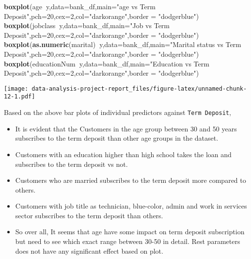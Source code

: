 \documentclass[
]{article}
\newenvironment{Shaded}{\begin{snugshade}}{\end{snugshade}}
\newcommand{\DataTypeTok}[1]{\textcolor[rgb]{0.13,0.29,0.53}{#1}}
\newcommand{\DecValTok}[1]{\textcolor[rgb]{0.00,0.00,0.81}{#1}}
\newcommand{\KeywordTok}[1]{\textcolor[rgb]{0.13,0.29,0.53}{\textbf{#1}}}
\newcommand{\NormalTok}[1]{#1}
\newcommand{\OperatorTok}[1]{\textcolor[rgb]{0.81,0.36,0.00}{\textbf{#1}}}
\newcommand{\StringTok}[1]{\textcolor[rgb]{0.31,0.60,0.02}{#1}}
\begin{document}
\begin{Shaded}
\begin{Highlighting}[]
\KeywordTok{boxplot}\NormalTok{(age}\OperatorTok{~}\NormalTok{y,}\DataTypeTok{data=}\NormalTok{bank_df,}\DataTypeTok{main=}\StringTok{"age vs Term Deposit"}\NormalTok{,}\DataTypeTok{pch=}\DecValTok{20}\NormalTok{,}\DataTypeTok{cex=}\DecValTok{2}\NormalTok{,}\DataTypeTok{col=}\StringTok{"darkorange"}\NormalTok{,}\DataTypeTok{border =} \StringTok{"dodgerblue"}\NormalTok{)}
\KeywordTok{boxplot}\NormalTok{(jobclass}\OperatorTok{~}\NormalTok{y,}\DataTypeTok{data=}\NormalTok{bank_df,}\DataTypeTok{main=}\StringTok{"Job vs Term Deposit"}\NormalTok{,}\DataTypeTok{pch=}\DecValTok{20}\NormalTok{,}\DataTypeTok{cex=}\DecValTok{2}\NormalTok{,}\DataTypeTok{col=}\StringTok{"darkorange"}\NormalTok{,}\DataTypeTok{border =} \StringTok{"dodgerblue"}\NormalTok{)}
\KeywordTok{boxplot}\NormalTok{(}\KeywordTok{as.numeric}\NormalTok{(marital)}\OperatorTok{~}\NormalTok{y,}\DataTypeTok{data=}\NormalTok{bank_df,}\DataTypeTok{main=}\StringTok{"Marital status vs Term Deposit"}\NormalTok{,}\DataTypeTok{pch=}\DecValTok{20}\NormalTok{,}\DataTypeTok{cex=}\DecValTok{2}\NormalTok{,}\DataTypeTok{col=}\StringTok{"darkorange"}\NormalTok{,}\DataTypeTok{border =} \StringTok{"dodgerblue"}\NormalTok{)}
\KeywordTok{boxplot}\NormalTok{(educationNum}\OperatorTok{~}\NormalTok{y,}\DataTypeTok{data=}\NormalTok{bank_df,}\DataTypeTok{main=}\StringTok{"Education vs Term Deposit"}\NormalTok{,}\DataTypeTok{pch=}\DecValTok{20}\NormalTok{,}\DataTypeTok{cex=}\DecValTok{2}\NormalTok{,}\DataTypeTok{col=}\StringTok{"darkorange"}\NormalTok{,}\DataTypeTok{border =} \StringTok{"dodgerblue"}\NormalTok{)}
\end{Highlighting}
\end{Shaded}

\texttt{[image: data-analysis-project-report\_files/figure-latex/unnamed-chunk-12-1.pdf]}

Based on the above bar plots of individual predictors against
\texttt{Term\ Deposit},

\begin{itemize}
\item
  It is evident that the Customers in the age group between 30 and 50
  years subscribes to the term deposit than other age groups in the
  dataset.
\item
  Customers with an education higher than high school takes the loan and
  subscribes to the term deposit vs not.
\item
  Customers who are married subscribes to the term deposit more compared
  to others.
\item
  Customers with job title as technician, blue-color, admin and work in
  services sector subscribes to the term deposit than others.
\item
  So over all, It seems that age have some impact on term deposit
  subscription but need to see which exact range between 30-50 in
  detail. Rest parameters does not have any significant effect based on
  plot.
\end{itemize}
\end{document}
